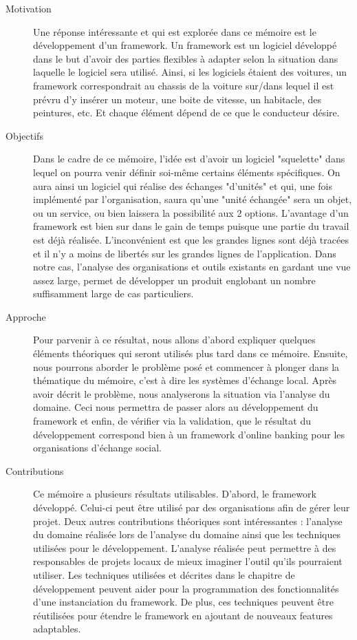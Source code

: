 \begin{description}
\item[Motivation] 
Une réponse intéressante et qui est explorée dans ce mémoire est le développement d'un framework.  Un framework est un logiciel développé dans le but d'avoir des parties flexibles à adapter selon la situation dans laquelle le logiciel sera utilisé.  Ainsi,  si les logiciels étaient des voitures,  un framework correspondrait au chassis de la voiture sur/dans lequel il est prévru d'y insérer un moteur,  une boite de vitesse,  un habitacle,  des peintures,  etc.  Et chaque élément dépend de ce que le conducteur désire.  

\item[Objectifs] 
Dans le cadre de ce mémoire,  l'idée est d'avoir un logiciel "squelette" dans lequel on pourra venir définir soi-même certains éléments spécifiques.   On aura ainsi un logiciel qui réalise des échanges "d'unités" et qui,  une fois implémenté par l'organisation,  saura qu'une "unité échangée" sera un objet,  ou un service,  ou bien laissera la possibilité aux 2 options.  L'avantage d'un framework est bien sur dans le gain de temps puisque une partie du travail est déjà réalisée.  L'inconvénient est que les grandes lignes sont déjà tracées et il n'y a moins de libertés sur les grandes lignes de l'application.  Dans notre cas,  l'analyse des organisations et outils existants en gardant une vue assez large,  permet de développer un produit englobant un nombre suffisamment large de cas particuliers.  

\item[Approche]
Pour parvenir à ce résultat,  nous allons d'abord expliquer quelques éléments théoriques qui seront utilisés plus tard dans ce mémoire.  Ensuite,  nous pourrons aborder le problème posé et commencer à plonger dans la thématique du mémoire,  c'est à dire les systèmes d'échange local.  Après avoir décrit le problème,  nous analyserons la situation via l'analyse du domaine.  Ceci nous permettra de passer alors au développement du framework et enfin,  de vérifier via la validation,  que le résultat du développement correspond bien à un framework d'online banking pour les organisations d'échange social.

\item[Contributions]

Ce mémoire a plusieurs résultats utilisables.  D'abord,  le framework développé.  Celui-ci peut être utilisé par des organisations afin de gérer leur projet.  Deux autres contributions théoriques sont intéressantes : l'analyse du domaine réalisée lors de l'analyse du domaine ainsi que les techniques utilisées pour le développement.  L'analyse réalisée peut permettre à des responsables de projets locaux de mieux imaginer l'outil qu'ils pourraient utiliser.  Les techniques utilisées et décrites dans le chapitre de développement peuvent aider pour la programmation des fonctionnalités d'une instanciation du framework.  De plus,  ces techniques peuvent être réutilisées pour étendre le framework en ajoutant de nouveaux features adaptables.


\end{description}
